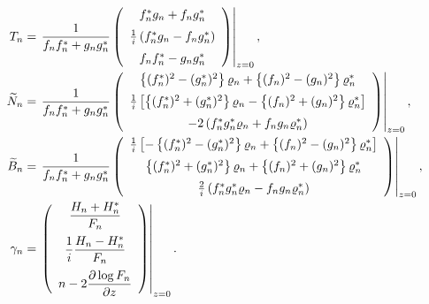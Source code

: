 \documentclass[10pt,a4paper]{amsart}
\begin{document}
\begin{align}\label{T}
  T_{n} &=\left. \frac{1}{f_{n}f_{n}^{*}+g_{n}g_{n}^{*}} \left(
    \begin{array}{c}
   \vspace{2mm}
      f_{n}^{*}g_{n}+f_{n}g_{n}^{*} \\
      \vspace{2mm}
      \frac{1}{i}\left(f_{n}^{*}g_{n}-f_{n}g_{n}^{*}\right) \\
      f_{n}f_{n}^{*}-g_{n}g_{n}^{*}
    \end{array}
  \right)\right|_{z=0}, \\
  \widetilde{N}_{n}&=\left.\frac{1}{f_{n}f_{n}^{*}+g_{n}g_{n}^{*}} \left(
    \begin{array}{c}
    \vspace{2mm}
      \left\{(f_{n}^{*})^{2}-(g_{n}^{*})^{2}\right\}\varrho_{n}+ \left\{(f_{n})^{2}-(g_{n})^{2}\right\}\varrho_{n}^{*} \\
      \vspace{2mm}
      \frac{1}{i}\left[\left\{(f_{n}^{*})^{2}+(g_{n}^{*})^{2}\right\}\varrho_{n}-\left\{(f_{n})^{2}+(g_{n})^{2}\right\}\varrho_{n}^{*}\right] \\
      -2\left(f_{n}^{*}g_{n}^{*}\varrho_{n}+f_{n}g_{n}\varrho_{n}^{*}\right)
    \end{array}
  \right)\right|_{z=0}, \nonumber\\
  \widetilde{B}_{n}&=\left. \frac{1}{f_{n}f_{n}^{*}+g_{n}g_{n}^{*}} \left(
    \begin{array}{c}
    \vspace{2mm}
       \frac{1}{i}\left[-\left\{(f_{n}^{*})^{2}-(g_{n}^{*})^{2}\right\}\varrho_{n}+ \left\{(f_{n})^{2}-(g_{n})^{2}\right\}\varrho_{n}^{*}\right] \\
       \vspace{2mm}
      \left\{(f_{n}^{*})^{2}+(g_{n}^{*})^{2}\right\}\varrho_{n}+ \left\{(f_{n})^{2}+(g_{n})^{2}\right\}\varrho_{n}^{*} \\
      \frac{2}{i}\left(f_{n}^{*}g_{n}^{*}\varrho_{n}-f_{n}g_{n}\varrho_{n}^{*}\right)
    \end{array}
  \right)\right|_{z=0}, \nonumber \\
 \gamma_{n}&= \left.\left(
        \begin{array}{c}
        \vspace{2mm}
    \dfrac{H_{n}+H_{n}^*}{F_{n}}\\
    \vspace{2mm}
    \dfrac{1}{i}\dfrac{H_{n}-H_{n}^*}{F_{n}}\\
    n-2\dfrac{\partial\log F_{n}}{\partial z}
        \end{array}
      \right) \right|_{z=0}. \nonumber  
\end{align}
\end{document}
